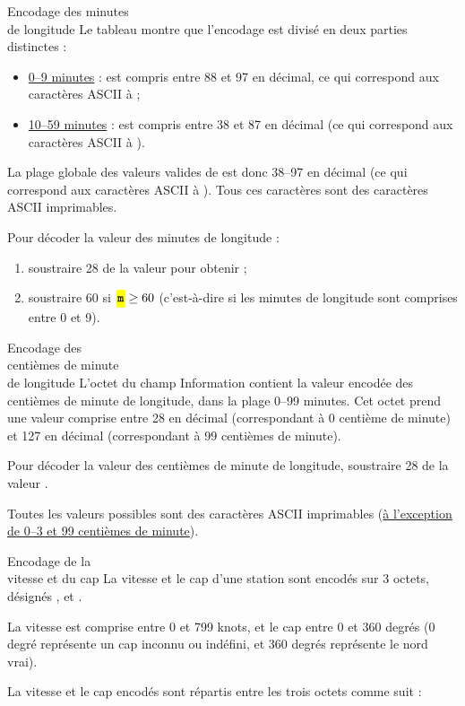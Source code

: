 \begin{aprssideblock}{Encodage des minutes\\de longitude}
\normalsize
Le tableau montre que l'encodage est divisé en deux parties distinctes :

\begin{itemize}\chTenItems
\item \underline{0--9 minutes} :  est compris entre 88 et 97 en
  décimal, ce qui correspond aux caractères ASCII  à  ;
\item \underline{10--59 minutes} :  est compris entre 38 et 87 en
  décimal (ce qui correspond aux caractères ASCII \lit{\&} à ).
\end{itemize}

La plage globale des valeurs valides de  est donc 38--97 en décimal
(ce qui correspond aux caractères ASCII \lit{\&} à ). Tous ces
caractères sont des caractères ASCII imprimables.

Pour décoder la valeur des minutes de longitude :

\begin{enumerate}\chTenItems
\item soustraire 28 de la valeur  pour obtenir  ;
\item soustraire 60 si $\lit{m} \ge 60$ (c'est-à-dire si les minutes de longitude
  sont comprises entre 0 et 9).
\end{enumerate}
\end{aprssideblock}

\begin{aprssideblock}{Encodage des\\centièmes de minute\\de longitude}
L'octet  du champ Information contient la valeur encodée des
centièmes de minute de longitude, dans la plage 0--99 minutes. Cet octet
prend une valeur comprise entre 28 en décimal (correspondant à 0 centième de
minute) et 127 en décimal (correspondant à 99 centièmes de minute).

Pour décoder la valeur des centièmes de minute de longitude, soustraire 28 de
la valeur .

Toutes les valeurs possibles sont des caractères ASCII imprimables
(\underline{à l'exception de 0--3 et 99 centièmes de minute}).
\end{aprssideblock}

\begin{aprssideblock}{Encodage de la\\vitesse et du cap}
La vitesse et le cap d'une station sont encodés sur 3 octets, désignés
,  et .

La vitesse est comprise entre 0 et 799 knots, et le cap entre 0 et 360 degrés
(0 degré représente un cap inconnu ou indéfini, et 360 degrés représente le
nord vrai).

La vitesse et le cap encodés sont répartis entre les trois octets comme suit :
\end{aprssideblock}

